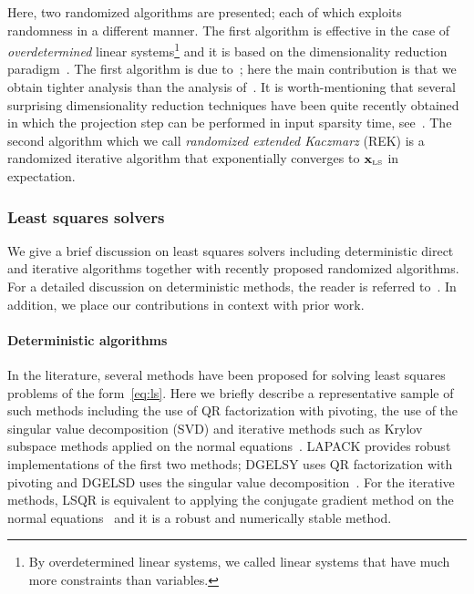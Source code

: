 %
Here, two randomized algorithms are presented; each of which exploits randomness in a different manner. The first algorithm is effective in the case of \emph{overdetermined} linear systems\footnote{By overdetermined linear systems, we called linear systems that have much more constraints than variables.} and it is based on the dimensionality reduction paradigm~\cite{l2_regression:drineas06,sarlos,low_rank:STOC09,CW_stoc09,drineas:tensor_sparsification,chernoff:matrix_valued:MZ11,fasterLS}. The first algorithm is due to~\cite{sarlos}; here the main contribution is that we obtain tighter analysis than the analysis of~\cite{sarlos}. It is worth-mentioning that several surprising dimensionality reduction techniques have been quite recently obtained in which the projection step can be performed in input sparsity time, see~\cite{ls:nnzA,OSNAP,MP12}. The second algorithm which we call \emph{randomized extended Kaczmarz} (REK) is a randomized iterative algorithm that exponentially converges to $\mathbf{x}_{\textrm{\tiny LS}}$ in expectation.
%

%
%
\subsubsection*{Least squares solvers}\label{sec:related}
%
We give a brief discussion on least squares solvers including deterministic direct and iterative algorithms together with recently proposed randomized algorithms. For a detailed discussion on deterministic methods, the reader is referred to~\cite{book:Bjork}. In addition, we place our contributions in context with prior work.
\paragraph{Deterministic algorithms}
In the literature, several methods have been proposed for solving least squares problems of the form~\eqref{eq:ls}. Here we briefly describe a representative sample of such methods including the use of QR factorization with pivoting, the use of the singular value decomposition (SVD) and iterative methods such as Krylov subspace methods applied on the normal equations~\cite{book:Saad}. LAPACK provides robust implementations of the first two methods; DGELSY uses QR factorization with pivoting and DGELSD uses the singular value decomposition~\cite{LAPACK}. For the iterative methods, LSQR is equivalent to applying the conjugate gradient method on the normal equations~\cite{PS82} and it is a robust and numerically stable method.
